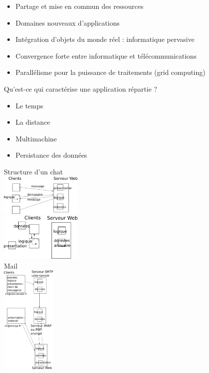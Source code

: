\begin{itemize}
	\item Partage et mise en commun des ressources
	\item Domaines nouveaux d'applications
	\item Intégration d'objets du monde réel : informatique pervasive
	\item Convergence forte entre informatique et télécommunications
	\item Parallélisme pour la puissance de traitements (grid computing)
\end{itemize}

 Qu'est-ce qui caractérise une application répartie ?
\begin{itemize}
	\item Le temps
	\item La distance
	\item Multimachine
	\item Persistance des données
\end{itemize}

 Structure d'un chat \\
	\includegraphics[width=150px]{Images/01_exo1a.pdf} \\
	\includegraphics[width=150px]{Images/01_exo1b.pdf} \\

 Mail \\
	\includegraphics[width=100px]{Images/02_exo2.pdf} \\

